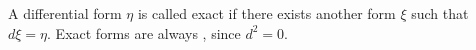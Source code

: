 \documentclass[12pt]{article}
\begin{document}
A differential form $\eta$ is called exact if there exists another form $\xi$ such that $d\xi=\eta$.
Exact forms are always , since $d^2=0$.
\end{document}

